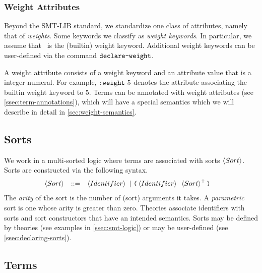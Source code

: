 \documentclass[english,a4paper,10pt]{article}
\begin{document}
\subsubsection{Weight Attributes}
\label{sec:weight-attributes}
Beyond the SMT-LIB standard, we standardize one class of attributes, namely that of \emph{weights}.
Some keywords we classify as \emph{weight keywords}.
In particular, we assume that \kweight\ is the (builtin) weight keyword.
Additional weight keywords can be user-defined via the command $\texttt{declare-weight}$.

A weight attribute consists of a weight keyword and an attribute value that is a integer numeral.
For example, $\texttt{:weight}\mbox{ }5$ denotes the attribute associating the builtin weight keyword to $5$.
Terms can be annotated with weight attributes (see \cref{ssec:term-annotations}),
which will have a special semantics which we will describe in detail in \cref{sec:weight-semantics}.

\subsection{Sorts}

We work in a multi-sorted logic where terms 
are associated with sorts $\left\langle Sort\right\rangle$.
Sorts are constructed via the following syntax.
\begin{alignat*}{1}
 & \begin{array}{rcl}
\left\langle Sort\right\rangle & ::= & \left\langle Identifier\right\rangle\mbox{ }|\mbox{ }\texttt{(}\left\langle Identifier\right\rangle\mbox{ }\left\langle Sort\right\rangle^{+}\texttt{)}\\
\end{array}
\end{alignat*}
The \emph{arity} of the sort is the number of (sort) arguments it takes.
A \emph{parametric} sort is one whose arity is greater than zero.
Theories associate identifiers with sorts and sort constructors
that have an intended semantics.
Sorts may be defined by theories (see examples in \cref{ssec:smt-logic})
or may be user-defined
(see \cref{ssec:declaring-sorts}).

\subsection{Terms}
\end{document}
